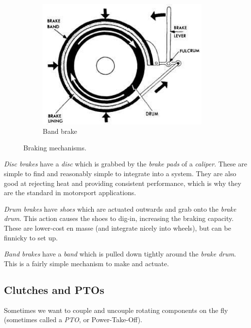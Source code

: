 \documentclass[10pt,letterpaper]{book}
\begin{document}
\begin{figure}[H]
\begin{subfigure}[b]{.32\linewidth}
		\includegraphics[width=0.95\textwidth]{imgs/brake_band.jpeg}
		\caption{Band brake}
	\end{subfigure}
	\caption{Braking mechanisms.}
\end{figure}

\begin{asparaenum}[a)]
	\item \textit{Disc brakes} have a \textit{disc} which is grabbed by the \textit{brake pads} of a \textit{caliper}. These are simple to find and reasonably simple to integrate into a system. They are also good at rejecting heat and providing consistent performance, which is why they are the standard in motorsport applications.
	\item \textit{Drum brakes} have \textit{shoes} which are actuated outwards and grab onto the \textit{brake drum}. This action causes the shoes to dig-in, increasing the braking capacity. These are lower-cost en masse (and integrate nicely into wheels), but can be finnicky to set up.
	\item \textit{Band brakes} have a \textit{band} which is pulled down tightly around the \textit{brake drum}. This is a fairly simple mechanism to make and actuate. 
\end{asparaenum}


\subsection{Clutches and PTOs}

Sometimes we want to couple and uncouple rotating components on the fly (sometimes called a \textit{PTO}, or Power-Take-Off).
\end{document}
